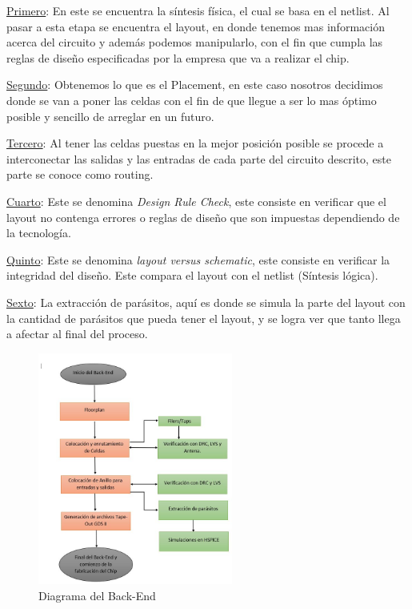 \underline{Primero}: En este se encuentra la síntesis física, el cual se basa en el netlist. Al pasar a esta etapa se encuentra el layout, en donde tenemos mas información acerca del circuito y además podemos manipularlo, con el fin que cumpla las reglas de diseño especificadas por la empresa que va a realizar el chip.

\underline{Segundo}: Obtenemos lo que es el Placement, en este caso nosotros decidimos donde se van a poner las celdas con el fin de que llegue a ser lo mas óptimo posible y sencillo de arreglar en un futuro.

\underline{Tercero}: Al tener las celdas puestas en la mejor posición posible se procede a interconectar las salidas y las entradas de cada parte del circuito descrito, este parte se conoce como routing.

\underline{Cuarto}: Este se denomina \textit{Design Rule Check}, este consiste en verificar que el layout no contenga errores o reglas de diseño que son impuestas dependiendo de la tecnología.

\underline{Quinto}: Este se denomina \textit{layout versus schematic}, este consiste en verificar la integridad del diseño. Este compara el layout con el netlist (Síntesis lógica).

\underline{Sexto}: La extracción de parásitos, aquí es donde se simula la parte del layout con la cantidad de parásitos que pueda tener el layout, y se logra ver que tanto llega a afectar al final del proceso.

 \cite{charls} 
\begin{figure}[h]
    \centering
    \includegraphics[width=0.57\textwidth]{figuras/Back.JPG}
    \caption{Diagrama del Back-End}
    \label{fig:mesh1}
\end{figure}
\newpage

